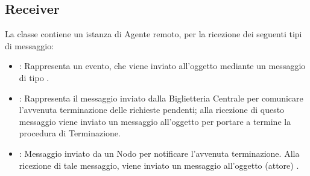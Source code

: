 	\subsection{Receiver}
	La classe  contiene un istanza di Agente remoto, per la ricezione dei seguenti tipi di messaggio:
	\begin{itemize}
		\item {}: Rappresenta un evento, che viene inviato all'oggetto  mediante un messaggio di tipo .
		\item {}: Rappresenta il messaggio inviato dalla Biglietteria Centrale per comunicare l'avvenuta terminazione delle richieste pendenti; alla ricezione di questo messaggio viene inviato un messaggio  all'oggetto  per portare a termine la procedura di Terminazione.
		\item {}: Messaggio inviato da un Nodo per notificare l'avvenuta terminazione. Alla ricezione di tale messaggio, viene inviato un messaggio  all'oggetto (attore) .
	\end{itemize}
	
